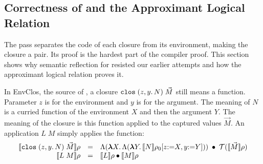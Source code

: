 

\subsection{Correctness of  and the Approximant Logical Relation}
\label{sec:approx-lr}

The  pass separates the code of each closure from
its environment, making the closure a pair. Its proof is the hardest
part of the compiler proof. This section shows why semantic reflection
for  resisted our earlier attempts and how the
approximant logical relation proves it.

In EnvClos, the source of , a closure
$\mathtt{clos}\;(z, y.\,N)\;\vec{M}$ still means a function.  Parameter
$z$ is for the environment and $y$ is for the argument. The meaning of
$N$ is a curried function of the environment $X$ and then the argument
$Y$. The meaning of the closure is this function applied to 
the captured values $\vec{M}$. An application $L\;M$ simply applies
the function:
\[
\begin{array}{rcl}
    \llbracket \mathtt{clos}\;(z, y.\,N)\;\vec{M} \rrbracket\rho & = &
    \Lambda(\boldsymbol{\lambda} X.\, \Lambda(\boldsymbol{\lambda} Y.\, \llbracket N \rrbracket\rho_0[z{:=}X, y{:=}Y])) \;\mathbin{\bullet}\; \mathcal{T}(\llbracket \vec{M} \rrbracket\rho)\\
  \llbracket L\;M \rrbracket\rho & = & \llbracket L \rrbracket\rho \mathbin{\bullet} \llbracket M \rrbracket\rho
\end{array}
\]

